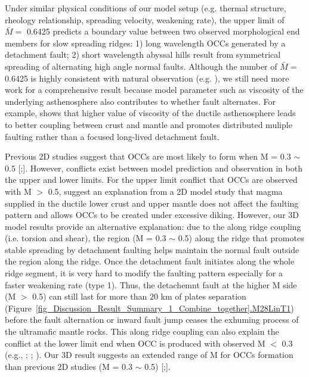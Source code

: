 Under similar physical conditions of our model setup (e.g. thermal structure, rheology relationship, spreading velocity, weakening rate), the upper limit of $\bar{M} = $ 0.6425 predicts a boundary value between two observed morphological end members for slow spreading ridges: 1) long wavelength OCCs generated by a detachment fault; 2) short wavelength abyssal hills result from symmetrical spreading of alternating high angle normal faults. Although the number of $\bar{M} = $ 0.6425 is highly consistent with natural observation (e.g. \citep{MacLeod2009}), we still need more work for a comprehensive result because model parameter such as viscosity of the underlying asthenosphere also contributes to whether fault alternates. For example, \citep{Allken2012} shows that higher value of viscosity of the ductile asthenosphere leads to better coupling between crust and mantle and promotes distributed muliple faulting rather than a focused long-lived detachment fault.

Previous 2D studies suggest that OCCs are most likely to form when M = 0.3 $\sim$ 0.5 [\citealp{Buck2005};\citealp{Tucholke2008}]. However, conflicts exist between model prediction and observation in both the upper and lower limits. For the upper limit conflict that OCCs are observed with M $>$ 0.5, \citet{Olive2010} suggest an explanation from a 2D model study that magma supplied in the ductile lower crust and upper mantle does not affect the faulting pattern and allows OCCs to be created under excessive diking. However, our 3D model results provide an alternative explanation: due to the along ridge coupling (i.e. torsion and shear), the region (M = 0.3 $\sim$ 0.5) along the ridge that promotes stable spreading by detachment faulting helps maintain the normal fault outside the region along the ridge. Once the detachment fault initiates along the whole ridge segment, it is very hard to modify the faulting pattern especially for a faster weakening rate (type 1). Thus, the detachemnt fault at the higher M side (M $>$ 0.5) can still last for more than 20 km of plates separation (Figure~\hyperref[fig_Discussion_Result_Summary_1_Combine_together]{\ref{fig_Discussion_Result_Summary_1_Combine_together}.M28LinT1}) before the fault alternation or inward fault jump ceases the exhuming process of the ultramafic mantle rocks. This along ridge coupling can also explain the conflict at the lower limit end when OCC is produced with observed M $<$ 0.3 (e.g., \citealp{Dick2008}; \citealp{Grimes2008}; \citealp{Baines2008}). Our 3D result suggests an extended range of M for OCCs formation than previous 2D studies (M = 0.3 $\sim$ 0.5) [\citealp{Buck2005};\citealp{Tucholke2008}]. 


